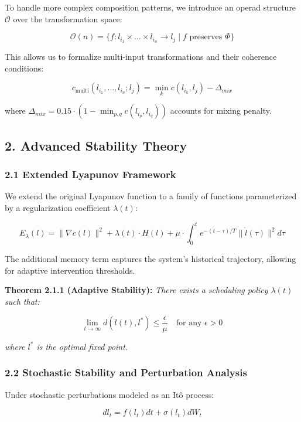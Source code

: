 \documentclass[
]{article}
\begin{document}
To handle more complex composition patterns, we introduce an operad
structure \(\mathcal{O}\) over the transformation space:

\[\mathcal{O}(n) = \{f: l_{i_1} \times \ldots \times l_{i_n} \to l_j \mid f \text{ preserves } \Phi\}\]

This allows us to formalize multi-input transformations and their
coherence conditions:

\[c_{\text{multi}}(l_{i_1}, \ldots, l_{i_n}; l_j) = \min_k c(l_{i_k}, l_j) - \Delta_{mix}\]

where \(\Delta_{mix} = 0.15 \cdot (1 - \min_{p,q} c(l_{i_p}, l_{i_q}))\)
accounts for mixing penalty.

\subsection{2. Advanced Stability
Theory}\label{advanced-stability-theory}

\subsubsection{2.1 Extended Lyapunov
Framework}\label{extended-lyapunov-framework}

We extend the original Lyapunov function to a family of functions
parameterized by a regularization coefficient \(\lambda(t)\):

\[E_{\lambda}(l) = \|\nabla c(l)\|^2 + \lambda(t) \cdot H(l) + \mu \cdot \int_0^t e^{-(t-\tau)/T} \|\dot{l}(\tau)\|^2 d\tau\]

The additional memory term captures the system's historical trajectory,
allowing for adaptive intervention thresholds.

\textbf{Theorem 2.1.1 (Adaptive Stability):} \emph{There exists a
scheduling policy \(\lambda(t)\) such that:}

\[\lim_{t \to \infty} d(l(t), l^*) \leq \frac{\epsilon}{\mu} \quad \text{for any } \epsilon > 0\]

\emph{where \(l^*\) is the optimal fixed point.}

\subsubsection{2.2 Stochastic Stability and Perturbation
Analysis}\label{stochastic-stability-and-perturbation-analysis}

Under stochastic perturbations modeled as an Itô process:

\[dl_t = f(l_t) dt + \sigma(l_t) dW_t\]
\end{document}
